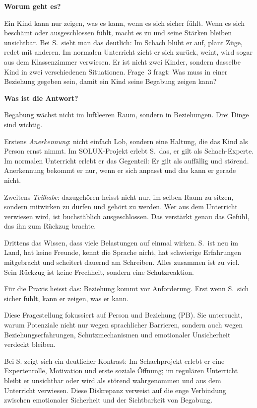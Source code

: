 \documentclass[ngerman, a4paper]{article}
\begin{document}
\begin{frageantwort3}
  \textbf{Worum geht es?}
  
  Ein Kind kann nur zeigen, was es kann, wenn es sich sicher fühlt. Wenn
  es sich beschämt oder ausgeschlossen fühlt, macht es zu und seine
  Stärken bleiben unsichtbar. Bei S.~sieht man das deutlich: Im Schach
  blüht er auf, plant Züge, redet mit anderen. Im normalen Unterricht
  zieht er sich zurück, weint, wird sogar aus dem Klassenzimmer verwiesen.
  Er ist nicht zwei Kinder, sondern dasselbe Kind in zwei verschiedenen
  Situationen. Frage~3 fragt: Was muss in einer Beziehung gegeben sein,
  damit ein Kind seine Begabung zeigen kann?
  
  \medskip
  \textbf{Was ist die Antwort?}
  
  Begabung wächst nicht im luftleeren Raum, sondern in Beziehungen. Drei
  Dinge sind wichtig.
  
  Erstens \emph{Anerkennung}: nicht einfach Lob, sondern eine Haltung,
  die das Kind als Person ernst nimmt. Im SOLUX-Projekt erlebt S.~das,
  er gilt als Schach-Experte. Im normalen Unterricht erlebt er das
  Gegenteil: Er gilt als auffällig und störend. Anerkennung bekommt er
  nur, wenn er sich anpasst und das kann er gerade nicht.
  
  Zweitens \emph{Teilhabe}: dazugehören heisst nicht nur, im selben Raum
  zu sitzen, sondern mitwirken zu dürfen und gehört zu werden. Wer aus
  dem Unterricht verwiesen wird, ist buchstäblich ausgeschlossen. Das
  verstärkt genau das Gefühl, das ihn zum Rückzug brachte.
  
  Drittens das Wissen, dass viele Belastungen auf einmal wirken. S.~ist
  neu im Land, hat keine Freunde, kennt die Sprache nicht, hat schwierige
  Erfahrungen mitgebracht und scheitert dauernd am Schreiben. Alles
  zusammen ist zu viel. Sein Rückzug ist keine Frechheit, sondern eine
  Schutzreaktion.
  
  Für die Praxis heisst das: Beziehung kommt vor Anforderung. Erst wenn
  S.~sich sicher fühlt, kann er zeigen, was er kann.
  \end{frageantwort3}

 
Diese Fragestellung fokussiert auf Person und Beziehung (PB). Sie untersucht, warum
Potenziale nicht nur wegen sprachlicher Barrieren, sondern auch wegen
Beziehungserfahrungen, Schutzmechanismen und emotionaler Unsicherheit verdeckt bleiben.
 
Bei S. zeigt sich ein deutlicher Kontrast: Im Schachprojekt erlebt er eine Expertenrolle,
Motivation und erste soziale Öffnung; im regulären Unterricht bleibt er unsichtbar oder
wird als störend wahrgenommen und aus dem Unterricht verwiesen. Diese Diskrepanz
verweist auf die enge Verbindung zwischen emotionaler Sicherheit und der Sichtbarkeit
von Begabung.
 
\end{document}
